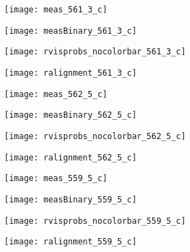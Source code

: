 \begin{figure} [h!]
	\centering
	\begin{subfigure}[b]{0.24\textwidth}
                \texttt{[image: meas\_561\_3\_c]}
                \caption{}
	\end{subfigure}
  	\centering
	\begin{subfigure}[b]{0.24\textwidth}
                \texttt{[image: measBinary\_561\_3\_c]}
		\caption{}
  	\end{subfigure}
  	\centering
	\begin{subfigure}[b]{0.24\textwidth}
                \texttt{[image: rvisprobs\_nocolorbar\_561\_3\_c]}
		\caption{}
  	\end{subfigure}
  	\centering
	\begin{subfigure}[b]{0.24\textwidth}
                \texttt{[image: ralignment\_561\_3\_c]}
		\caption{}
  	\end{subfigure}
  	
  	\begin{subfigure}[b]{0.24\textwidth}
                \texttt{[image: meas\_562\_5\_c]}
                \caption{}
	\end{subfigure}
  	\centering
	\begin{subfigure}[b]{0.24\textwidth}
                \texttt{[image: measBinary\_562\_5\_c]}
		\caption{}
  	\end{subfigure}
  	\centering
	\begin{subfigure}[b]{0.24\textwidth}
                \texttt{[image: rvisprobs\_nocolorbar\_562\_5\_c]}
		\caption{}
  	\end{subfigure}
  	\centering
	\begin{subfigure}[b]{0.24\textwidth}
                \texttt{[image: ralignment\_562\_5\_c]}
		\caption{}
  	\end{subfigure}
  	
  	\begin{subfigure}[b]{0.24\textwidth}
                \texttt{[image: meas\_559\_5\_c]}
                \caption{}
	\end{subfigure}
  	\centering
	\begin{subfigure}[b]{0.24\textwidth}
                \texttt{[image: measBinary\_559\_5\_c]}
		\caption{}
  	\end{subfigure}
  	\centering
	\begin{subfigure}[b]{0.24\textwidth}
                \texttt{[image: rvisprobs\_nocolorbar\_559\_5\_c]}
		\caption{}
  	\end{subfigure}
  	\centering
	\begin{subfigure}[b]{0.24\textwidth}
                \texttt{[image: ralignment\_559\_5\_c]}
		\caption{}
  	\end{subfigure}
  	

\end{figure}
